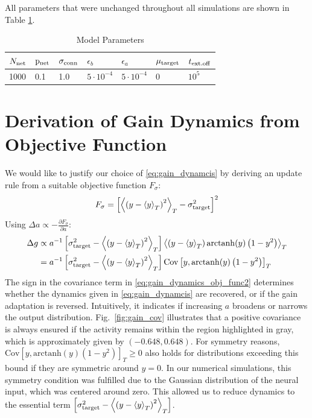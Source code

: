 \documentclass[10pt,a4paper]{article}
\newcommand{\avgt}[1]{\left< #1 \right>_T}
\begin{document}
All parameters that were unchanged throughout all simulations are shown in Table \ref{tab:params}.

\begin{table}[h]
	\caption{Model Parameters}
	\centering
	\vspace{5pt}
	\begin{tabular}{ l | l | l | l | l | l | l }
		 $N_{\rm net}$ & ${\rm p_{net}}$ & $\sigma_{\rm conn}$ & $\epsilon_{b}$ & $\epsilon_{a}$ & $\mu_{\rm target}$ & $t_{\rm ext.off}$  \\
		\hline
		\hline
		\rule{0pt}{12pt}
		1000 & 0.1 & 1.0 & $5\cdot10^{-4}$ & $5\cdot10^{-4}$ & 0 & $10^5$
	\end{tabular}
	\label{tab:params}
\end{table}

\section{Derivation of Gain Dynamics from Objective Function}
We would like to justify our choice of \eqref{eq:gain_dynamcis} by deriving an update rule from a suitable objective function $F_{\sigma}$:
\begin{equation}
F_{\sigma} = \left[\avgt{\left(y-\avgt{y}\right)^2} - \sigma^2_{\rm target}\right]^2
\end{equation}
Using $\Delta a \propto - \frac{\partial F_\sigma}{\partial a}$:
\begin{align}
\Delta g &\propto a^{-1} \left[\sigma^2_{\rm target} - \avgt{\left(y-\avgt{y}\right)^2}\right]\avgt{\left(y-\avgt{y}\right)\mathrm{arctanh}(y)\left(1-y^2\right)} \label{eq:gain_dynamics_obj_func1} \\
&=a^{-1} \left[\sigma^2_{\rm target} - \avgt{\left(y-\avgt{y}\right)^2}\right]\mathrm{Cov}\left[ y,\mathrm{arctanh}(y)\left(1-y^2\right) \right]_T \label{eq:gain_dynamics_obj_func2}
\end{align}
The sign in the covariance term in \eqref{eq:gain_dynamics_obj_func2} determines whether the dynamics given in \eqref{eq:gain_dynamcis} are recovered, or if the gain adaptation is reversed. Intuitively, it indicates if increasing $a$ broadens or narrows the output distribution. Fig.~\ref{fig:gain_cov} illustrates that a positive covariance is always ensured if the activity remains within the region highlighted in gray, which is approximately given by $(-0.648,0.648)$. For symmetry reasons, $\mathrm{Cov}\left[ y,\mathrm{arctanh}(y)\left(1-y^2\right) \right]_T \geq 0$ also holds for distributions exceeding this bound if they are symmetric around $y=0$. In our numerical simulations, this symmetry condition was fulfilled due to the Gaussian distribution of the neural input, which was centered around zero. This allowed us to reduce dynamics to the essential term $\left[\sigma^2_{\rm target} - \avgt{\left(y-\avgt{y}\right)^2}\right]$.
\end{document}
